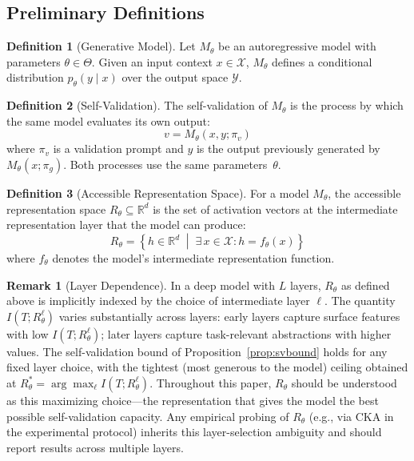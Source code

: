 \documentclass[11pt,a4paper]{article}
\theoremstyle{definition}
\newtheorem{definition}{Definition}[section]
\newtheorem{remark}{Remark}[section]
\newcommand{\Rtheta}{R_\theta}
\begin{document}
\subsection{Preliminary Definitions}

\begin{definition}[Generative Model]
Let $M_\theta$ be an autoregressive model with parameters $\theta \in \Theta$. Given an input context $x \in \mathcal{X}$, $M_\theta$ defines a conditional distribution $p_\theta(y \mid x)$ over the output space $\mathcal{Y}$.
\end{definition}

\begin{definition}[Self-Validation]
The self-validation of $M_\theta$ is the process by which the same model evaluates its own output:
\begin{equation}
v = M_\theta(x, y; \pi_v)
\end{equation}
where $\pi_v$ is a validation prompt and $y$ is the output previously generated by $M_\theta(x; \pi_g)$. Both processes use the same parameters~$\theta$.
\end{definition}

\begin{definition}[Accessible Representation Space]
For a model $M_\theta$, the accessible representation space $\Rtheta \subseteq \mathbb{R}^d$ is the set of activation vectors at the intermediate representation layer that the model can produce:
\begin{equation}
\Rtheta = \left\{ h \in \mathbb{R}^d \;\middle|\; \exists\, x \in \mathcal{X} : h = f_\theta(x) \right\}
\end{equation}
where $f_\theta$ denotes the model's intermediate representation function.
\end{definition}

\begin{remark}[Layer Dependence]
\label{rem:layer}
In a deep model with $L$ layers, $\Rtheta$ as defined above is implicitly indexed by the choice of intermediate layer $\ell$. The quantity $I(T; R_\theta^\ell)$ varies substantially across layers: early layers capture surface features with low $I(T; R_\theta^\ell)$; later layers capture task-relevant abstractions with higher values. The self-validation bound of Proposition~\ref{prop:svbound} holds for any fixed layer choice, with the tightest (most generous to the model) ceiling obtained at $R_\theta^* = \arg\max_\ell I(T; R_\theta^\ell)$. Throughout this paper, $\Rtheta$ should be understood as this maximizing choice---the representation that gives the model the best possible self-validation capacity. Any empirical probing of $R_\theta$ (e.g., via CKA in the experimental protocol) inherits this layer-selection ambiguity and should report results across multiple layers.
\end{remark}
\end{document}
